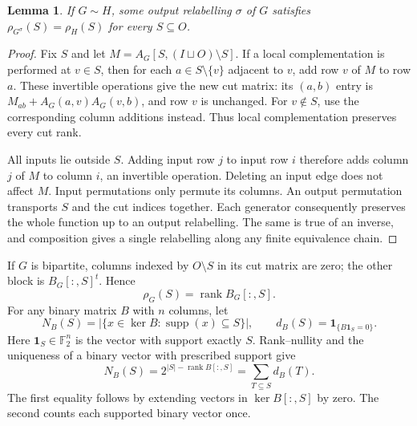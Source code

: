 \documentclass[11pt]{article}
\newtheorem{lemma}[theorem]{Lemma}
\newcommand{\F}{\mathbb F_2}
\newcommand{\rk}{\operatorname{rank}}
\begin{document}
\begin{lemma}\label{lem:invariant}
If $G\sim H$, some output relabelling $\sigma$ of $G$ satisfies
$\rho_{G^\sigma}(S)=\rho_H(S)$ for every $S\subseteq O$.
\end{lemma}
\begin{proof}
Fix $S$ and let $M=A_G[S,(I\sqcup O)\setminus S]$.
If a local complementation is performed at $v\in S$, then for each
$a\in S\setminus\{v\}$ adjacent to $v$, add row $v$ of $M$ to row $a$.
These invertible operations give the new cut matrix: its $(a,b)$ entry
is $M_{ab}+A_G(a,v)A_G(v,b)$, and row $v$ is unchanged.
For $v\notin S$, use the corresponding column additions instead.
Thus local complementation preserves every cut rank.

All inputs lie outside $S$. Adding input row $j$ to input row $i$
therefore adds column $j$ of $M$ to column $i$, an invertible operation.
Deleting an input edge does not affect $M$. Input permutations only
permute its columns. An output permutation transports $S$ and the cut
indices together. Each generator consequently preserves the whole
function up to an output relabelling. The same is true of an inverse,
and composition gives a single relabelling along any finite equivalence
chain.
\end{proof}

If $G$ is bipartite, columns indexed by $O\setminus S$ in its cut matrix
are zero; the other block is $B_G[:,S]^t$. Hence
\begin{equation}\label{eq:profile}
 \rho_G(S)=\rk B_G[:,S].
\end{equation}
For any binary matrix $B$ with $n$ columns, let
\[
 N_B(S)=|\{x\in\ker B:\operatorname{supp}(x)\subseteq S\}|,
 \qquad d_B(S)=\mathbf1_{\{B\mathbf1_S=0\}}.
\]
Here $\mathbf1_S\in\F^n$ is the vector with support exactly $S$.
Rank--nullity and the uniqueness of a binary vector with prescribed
support give
\begin{equation}\label{eq:counts}
 N_B(S)=2^{|S|-\rk B[:,S]}=\sum_{T\subseteq S}d_B(T).
\end{equation}
The first equality follows by extending vectors in $\ker B[:,S]$ by zero.
The second counts each supported binary vector once.
\end{document}
